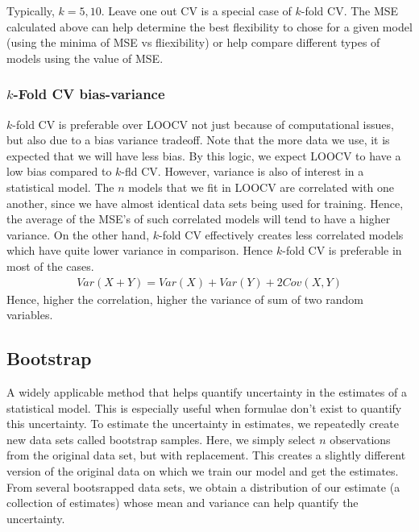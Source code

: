 \documentclass[11pt, a4paper]{article}
\begin{document}
    Typically, $k = 5, 10$. Leave one out CV is a special case of $k$-fold CV. The MSE calculated above can help determine the best flexibility to chose for a given model (using the minima of MSE vs fliexibility) or help compare different types of models using the value of MSE. \newline

    \subsubsection{$k$-Fold CV bias-variance}
    $k$-fold CV is preferable over LOOCV not just because of computational issues, but also due to a bias variance tradeoff. Note that the more data we use, it is expected that we will have less bias. By this logic, we expect LOOCV to have a low bias compared to $k$-fld CV. However, variance is also of interest in a statistical model. The $n$ models that we fit in LOOCV are correlated with one another, since we have almost identical data sets being used for training. Hence, the average of the MSE's of such correlated models will tend to have a higher variance. On the other hand, $k$-fold CV effectively creates less correlated models which have quite lower variance in comparison. Hence $k$-fold CV is preferable in most of the cases.
    \begin{align*}
        Var(X + Y) = Var(X) + Var(Y) + 2Cov(X,Y)
    \end{align*}
    Hence, higher the correlation, higher the variance of sum of two random variables.
    

    \subsection{Bootstrap}
    A widely applicable method that helps quantify uncertainty in the estimates of a statistical model. This is especially useful when formulae don't exist to quantify this uncertainty.\newline
    To estimate the uncertainty in estimates, we repeatedly create new data sets called bootstrap samples. Here, we simply select $n$ observations from the original data set, but with replacement. This creates a slightly different version of the original data on which we train our model and get the estimates. From several bootsrapped data sets, we obtain a distribution of our estimate (a collection of estimates) whose mean and variance can help quantify the uncertainty.\newline
\end{document}
